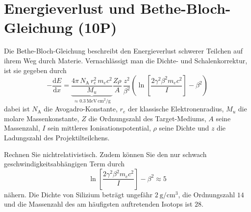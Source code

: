\section{Energieverlust und Bethe-Bloch-Gleichung (10P)}

Die Bethe-Bloch-Gleichung beschreibt den Energieverlust schwerer Teilchen auf ihrem Weg durch Materie. Vernachlässigt man die Dichte- und Schalenkorrektur, ist sie gegeben durch
  \begin{equation*}
    -\frac{\text{d}E}{\text{d}x}=\underbrace{\frac{4\pi\,N_\text{A}\,r_e^2\,m_e c^2}{M_u}}_{\approx\SI{0.3}{\mega\electronvolt\,\centi\meter^2\per\gram}}\frac{Z\rho}{A}\,\frac{z^2}{\beta^2}\left(\ln\left[\frac{2\gamma^2\beta^2m_ec^2}{I}\right]-\beta^2\right)
  \end{equation*}
  dabei ist $N_\text{A}$ die Avogadro-Konstante, $r_e$ der klassische Elektronenradius, $M_u$ die molare Massenkonstante,
  $Z$ die Ordnungszahl des Target-Mediums, $A$ seine Massenzahl, $I$ sein mittleres Ionisationspotential, $\rho$ seine Dichte
  und $z$ die Ladungszahl des Projektilteilchens.

  Rechnen Sie nichtrelativistisch.
  Zudem können Sie den nur schwach geschwindigkeitsabhängigen Term durch
  \begin{equation*}
	  \ln\left[\frac{2\gamma^2\beta^2m_ec^2}{I}\right]-\beta^2\approx 5
  \end{equation*}
  nähern.
  Die Dichte von Silizium beträgt ungefähr $\SI{2}{\gram\per\centi\meter^{3}}$, die Ordnungszahl $\num{14}$ und die Massenzahl des am häufigsten auftretenden Isotops ist $\num{28}$.

